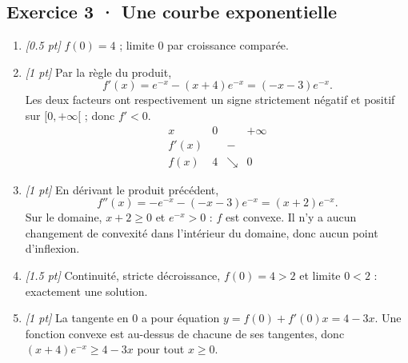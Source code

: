 \subsection*{Exercice 3 · Une courbe exponentielle}\begin{enumerate}

\item \textit{[\num{0,5} pt]} $f(0)=4$ ; limite $0$ par croissance comparée.

\item \textit{[1 pt]} Par la règle du produit,
\[f'(x)=e^{-x}-(x+4)e^{-x}=(-x-3)e^{-x}.\]
Les deux facteurs ont respectivement un signe strictement négatif et positif sur $[0,+\infty[$ ; donc $f'<0$.
\[\begin{array}{c|ccc}x&0&&+\infty\\\hline f'(x)&&-&\\\hline f(x)&4&\searrow&0\end{array}\]

\item \textit{[1 pt]} En dérivant le produit précédent,
\[f''(x)=-e^{-x}-(-x-3)e^{-x}=(x+2)e^{-x}.\]
Sur le domaine, $x+2\ge0$ et $e^{-x}>0$ : $f$ est convexe. Il n'y a aucun changement de convexité dans l'intérieur du domaine, donc aucun point d'inflexion.

\item \textit{[\num{1,5} pt]} Continuité, stricte décroissance, $f(0)=4>2$ et limite $0<2$ : exactement une solution.

\item \textit{[1 pt]} La tangente en $0$ a pour équation $y=f(0)+f'(0)x=4-3x$. Une fonction convexe est au-dessus de chacune de ses tangentes, donc $(x+4)e^{-x}\ge 4-3x$ pour tout $x\ge0$.

\end{enumerate}

